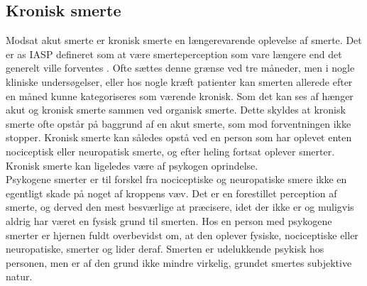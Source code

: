 \subsection{Kronisk smerte}
Modsat akut smerte er kronisk smerte en længerevarende oplevelse af smerte. Det er as IASP defineret som at være smerteperception som vare længere end det generelt ville forventes \citep{Carmon}. Ofte sættes denne grænse ved tre måneder, men i nogle kliniske undersøgelser, eller hos nogle kræft patienter kan smerten allerede efter en måned kunne kategoriseres som værende kronisk. Som det kan ses af  hænger akut og kronisk smerte sammen ved organisk smerte. Dette skyldes at kronisk smerte ofte opstår på baggrund af en akut smerte, som mod forventningen ikke stopper. Kronisk smerte kan således opstå ved en person som har oplevet enten nociceptisk eller neuropatisk smerte, og efter heling fortsat oplever smerter. Kronisk smerte kan ligeledes være af psykogen oprindelse.\\
Psykogene smerter er til forskel fra nociceptiske og neuropatiske smere ikke en egentligt skade på noget af kroppens væv. Det er en forestillet perception af smerte, og derved den mest besværlige at præcisere, idet der ikke er og muligvis aldrig har været en fysisk grund til smerten. Hos en person med psykogene smerter er hjernen fuldt overbevidst om, at den oplever fysiske, nociceptiske eller neuropatiske, smerter og lider deraf. Smerten er udelukkende psykisk hos personen, men er af den grund ikke mindre virkelig, grundet smertes subjektive natur. \citep{Giangregorio1997}




